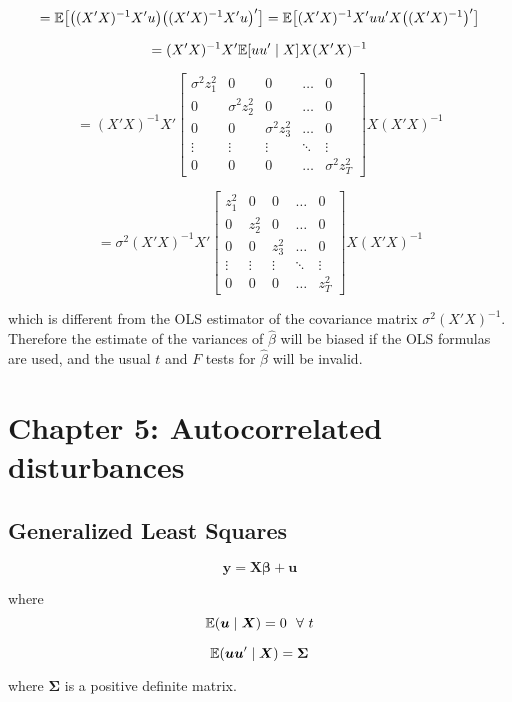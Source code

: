 \[
= \E \big[\big((X'X)^{-1}X'u\big)\big((X'X)^{-1}X'u \big) '\big] = \E \big[ (X'X)^{-1}X'uu'X\big((X'X)^{-1}\big)' \big]
\]

\[
= (X'X)^{-1}X' \E[uu' \mid X] X(X'X)^{-1}
\]

\[
= (X'X)^{-1}X' \begin{bmatrix}
    \sigma^2 z_1^2 &0 & 0 & \dots & 0 \\
   0 & \sigma^2 z_2^2 &0 & \dots  & 0 \\
   0 & 0 & \sigma^2 z_3^2 & \dots  & 0 \\
    \vdots & \vdots & \vdots & \ddots & \vdots \\
    0 & 0 &0 & \dots  & \sigma^2 z_T^2
\end{bmatrix}  X(X'X)^{-1}
\]

\[
= \sigma^2(X'X)^{-1}X' \begin{bmatrix}
    z_1^2 &0 & 0 & \dots & 0 \\
   0 & z_2^2 &0 & \dots  & 0 \\
   0 & 0 &  z_3^2 & \dots  & 0 \\
    \vdots & \vdots & \vdots & \ddots & \vdots \\
    0 & 0 &0 & \dots  &  z_T^2
\end{bmatrix}  X(X'X)^{-1}
\]

which is different from the OLS estimator of the covariance matrix \(\sigma^2(X'X)^{-1}\). Therefore the estimate of the variances of \(\hat{\beta}\) will be biased if the OLS formulas are used, and the usual \(t\) and \(F\) tests for \(\hat{\beta}\) will be invalid.



\section{Chapter 5: Autocorrelated disturbances}

\subsection{Generalized Least Squares}

\[
\boldsymbol{y} = \boldsymbol{X}\boldsymbol{\beta} + \boldsymbol{u}
\]

where
\[
\E(\boldsymbol{u} \mid \boldsymbol{X}) = 0 \ \ \forall \ t
\]

\[
\E(\boldsymbol{u} \boldsymbol{u}' \mid \boldsymbol{X}) = \boldsymbol{\Sigma} 
\]

where \(\boldsymbol{\Sigma}\) is a positive definite matrix.



